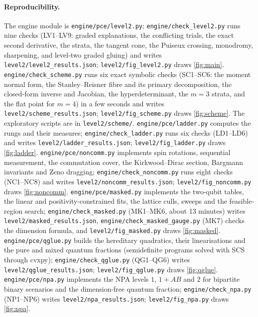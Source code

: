 \documentclass[11pt]{article}
\theoremstyle{definition}\newtheorem{definition}[theorem]{Definition}\newtheorem{remark}[theorem]{Remark}\newtheorem{example}[theorem]{Example}
\begin{document}
\paragraph{Reproducibility.}
The engine module is \texttt{engine/pce/level2.py}; \texttt{engine/check\_level2.py} runs nine checks (LV1--LV9: graded explanations,
the conflicting trials, the exact second derivative, the strata, the tangent cone, the Puiseux crossing, monodromy, sharpening, and level-two graded gluing) and
writes \texttt{level2/level2\_results.json}; \texttt{level2/fig\_level2.py} draws \cref{fig:main}. \texttt{engine/check\_scheme.py}
runs six exact symbolic checks (SC1--SC6: the moment normal form, the Stanley--Reisner fibre and its primary decomposition, the closed-form
inverse and Jacobian, the hyperdeterminant, the $m=3$ strata, and the flat point for $m=4$) in a few seconds and writes
\texttt{level2/scheme\_results.json}; \texttt{level2/fig\_scheme.py} draws \cref{fig:scheme}. The exploratory scripts are in
\texttt{level2/scheme/}. \texttt{engine/pce/ladder.py} computes the rungs and their measures; \texttt{engine/check\_ladder.py} runs six
checks (LD1--LD6) and writes \texttt{level2/ladder\_results.json}; \texttt{level2/fig\_ladder.py} draws \cref{fig:ladder}.
\texttt{engine/pce/noncomm.py} implements spin rotations, sequential measurement, the commutation cover, the Kirkwood--Dirac section,
Bargmann invariants and Zeno dragging; \texttt{engine/check\_noncomm.py} runs eight checks (NC1--NC8) and writes
\texttt{level2/noncomm\_results.json}; \texttt{level2/fig\_noncomm.py} draws \cref{fig:noncomm}.
\texttt{engine/pce/masked.py} implements the two-qubit tables, the linear and positivity-constrained fits, the lattice culls, sweeps and
the feasible-region search; \texttt{engine/check\_masked.py} (MK1--MK6, about 13 minutes) writes \texttt{level2/masked\_results.json},
\texttt{engine/check\_masked\_gauge.py} (MK7) checks the dimension formula, and \texttt{level2/fig\_masked.py} draws \cref{fig:masked}.
\texttt{engine/pce/qglue.py} builds the hereditary quadratics, their linearisations and the pure and mixed quantum fractions (semidefinite
programs solved with SCS through cvxpy); \texttt{engine/check\_qglue.py} (QG1--QG6) writes \texttt{level2/qglue\_results.json};
\texttt{level2/fig\_qglue.py} draws \cref{fig:qglue}.
\texttt{engine/pce/npa.py} implements the NPA levels $1$, $1{+}AB$ and $2$ for bipartite binary scenarios and the dimension-free quantum
fraction; \texttt{engine/check\_npa.py} (NP1--NP6) writes \texttt{level2/npa\_results.json}; \texttt{level2/fig\_npa.py} draws \cref{fig:npa}.
\end{document}
